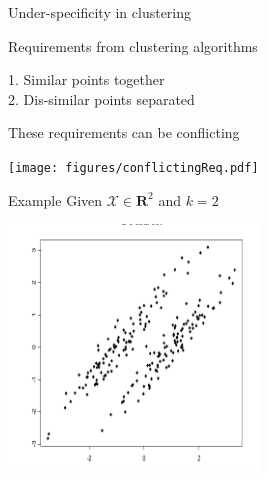 \documentclass{beamer}
\newcommand{\mc}{\mathcal}
\newcommand{\mb}{\mathbf}
\begin{document}
\begin{frame}{Under-specificity in clustering}
	
	Requirements from clustering algorithms\\
	\vspace{0.5cm}\begin{block}{}
	1. Similar points together\\
	\vspace{0.45cm}2. Dis-similar points separated
	\end{block}
	
	\vspace{0.5cm}These requirements can be conflicting
	\begin{center}
	\texttt{[image: figures/conflictingReq.pdf]}
	\end{center}
\end{frame}

\begin{frame}{Example}
	Given $\mc X \in \mb R^2$ and $k = 2$
	\begin{center}
	\includegraphics[trim={50 10 0 30},clip,width=0.5\textwidth]{figures/setX.png}
	\end{center}
\end{frame}
\end{document}
